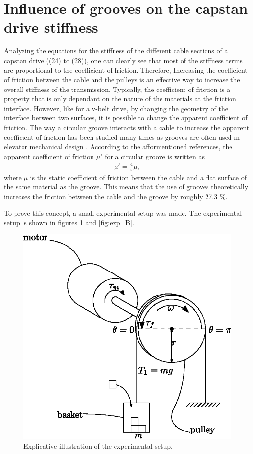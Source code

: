 \documentclass[10pt,cleanfoot]{asme2ej}
\begin{document}
\section{Influence of grooves on the capstan drive stiffness}
 Analyzing the equations for the stiffness of the different cable sections of a capstan drive ((24) to (28)), one can clearly see that most of the stiffness terms are proportional to the coefficient of friction. Therefore, Increasing the coefficient of friction between the cable and the pulleys is an effective way to increase the overall stiffness of the transmission. Typically, the coefficient of friction is a property that is only dependant on the nature of the materials at the friction interface. However, like for a v-belt drive, by changing the geometry of the interface between two surfaces, it is possible to change the apparent coefficient of friction. The way a circular groove interacts with a cable to increase the apparent coefficient of friction has been studied many times as grooves are often used in elevator mechanical design \cite{elevator_german}\cite{elevator}\cite{gibsonfred}\cite{koshaktraction}. According to the afformentioned references, the apparent coefficient of friction $\mu'$ for a circular groove is written as 
 \begin{align}
\mu' = \frac{4}{\pi}\mu, 
 \end{align}
where $\mu$ is the static coefficient of friction between the cable and a flat surface of the same material as the groove. This means that the use of grooves theoretically increases the friction between the cable and the groove by roughly 27.3 \%.
\par
To prove this concept, a small experimental setup was made. The experimental setup is shown in figures \ref{fig:exp_A} and \ref{fig:exp_B}. 
\begin{figure}
\centering
\includegraphics[width=0.5\columnwidth]{experimental_setup.eps}
\caption{Explicative illustration of the experimental setup.}
\label{fig:exp_A}
\end{figure}
\end{document}
